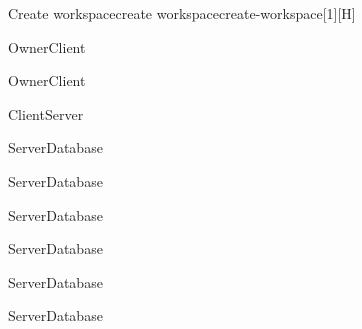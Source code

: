 \begin{sdfig}{Create workspace}{create workspace}{create-workspace}[1][H]

  \begin{seqdigauth}[Owner]
    \begin{umlcall}[op={Create workspace},return={Redirect to workspace creation}]{Owner}{Client}
    \end{umlcall}
    \begin{umlcall}[op={Submit name}]{Owner}{Client}
      \begin{umlcall}[op={Create workspace},return=Ok]{Client}{Server}
        \begin{umlcall}[op={Create project}]{Server}{Database}
          \begin{umlcall}[op={Create collection}]{Server}{Database}
            \begin{umlcall}[op={Create field}]{Server}{Database}
            \end{umlcall}
            \begin{umlcall}[op={Create view}]{Server}{Database}
            \end{umlcall}
            \begin{umlcall}[op={Create document}]{Server}{Database}
              \begin{umlcall}[op={Create block}]{Server}{Database}
              \end{umlcall}
            \end{umlcall}
          \end{umlcall}
        \end{umlcall}
      \end{umlcall}
    \end{umlcall}
  \end{seqdigauth}
\end{sdfig}

